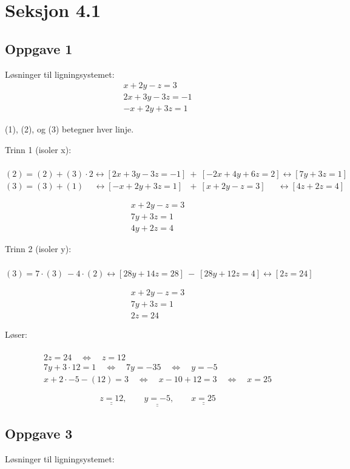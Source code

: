 \documentclass{article}
\date{}
\newcommand{\uu}[1]{\underline{\underline{#1}}}
\newcommand{\lra}{\leftrightarrow}
\newcommand{\eq}{\quad\Longleftrightarrow\quad}
\newcommand{\trip}{\ \ \ }
\begin{document}
\section*{Seksjon 4.1}

\subsection*{Oppgave 1}
Løsninger til ligningsystemet:
\begin{align}
    x + 2y - z = 3 \\
    2x + 3y - 3z = -1 \\
    -x + 2y + 3z = 1 
\end{align}

(1), (2), og (3) betegner hver linje.

Trinn 1 (isoler x): \\ \\
$(2) = (2) + (3)\cdot2 \lra [2x+3y-3z=-1]\ +\ [-2x+4y+6z=2] \lra [7y+3z=1]$ \\ 
$(3) = (3) + (1) \quad\, \lra [-x+2y+3z=1]\trip + \ [x+2y-z=3] \quad\ \ \lra [4z+2z=4]$


\setcounter{equation}{0}
\begin{align}
    x + 2y - z = 3 \\
    7y + 3z = 1 \\
    4y + 2z = 4
\end{align}

Trinn 2 (isoler y): \\ \\
$(3) = 7\cdot(3)\ - 4\cdot(2) \lra [28y+14z=28]\ -\ [28y+12z=4] \lra [2z=24]$

\setcounter{equation}{0}
\begin{align}
    x + 2y -z = 3 \\
    7y + 3z = 1 \\
    2z = 24
\end{align}

Løser: \\\\
\begin{align*}
    2z = 24 \eq z = 12 \\
    7y + 3\cdot12 = 1 \eq 7y = -35 \eq y = -5 \\
    x + 2\cdot-5 -(12) = 3 \eq x-10+12 = 3 \eq x = 25
\end{align*}

\[\uu{z = 12}, \qquad \uu{y = -5}, \qquad \uu{x = 25}\]

\newpage
\subsection*{Oppgave 3}
Løsninger til ligningsystemet:
\end{document}
